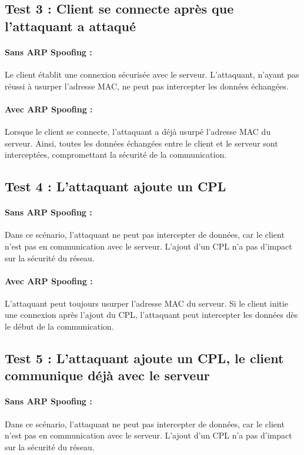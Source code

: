 \documentclass[a4paper,twocolumn]{report}
\begin{document}
\subsection{Test 3 : Client se connecte après que l'attaquant a attaqué}
\paragraph{Sans ARP Spoofing :}
Le client établit une connexion sécurisée avec le serveur. L'attaquant,
n'ayant pas réussi à usurper l'adresse MAC, ne peut pas intercepter les données échangées.

\paragraph{Avec ARP Spoofing :}
Lorsque le client se connecte, l'attaquant a déjà usurpé l'adresse MAC du serveur.
Ainsi, toutes les données échangées entre le client et le serveur sont interceptées,
compromettant la sécurité de la communication.

\subsection{Test 4 : L'attaquant ajoute un CPL}
\paragraph{Sans ARP Spoofing :}
Dans ce scénario, l'attaquant ne peut pas intercepter de données,
car le client n'est pas en communication avec le serveur.
L'ajout d'un CPL n'a pas d'impact sur la sécurité du réseau.

\paragraph{Avec ARP Spoofing :}
L'attaquant peut toujours usurper l'adresse MAC du serveur.
Si le client initie une connexion après l'ajout du CPL,
l'attaquant peut intercepter les données dès le début de la communication.

\subsection{Test 5 : L'attaquant ajoute un CPL, le client communique déjà avec le serveur}
\paragraph{Sans ARP Spoofing :}
Dans ce scénario, l'attaquant ne peut pas intercepter de données,
car le client n'est pas en communication avec le serveur.
L'ajout d'un CPL n'a pas d'impact sur la sécurité du réseau.
\end{document}

